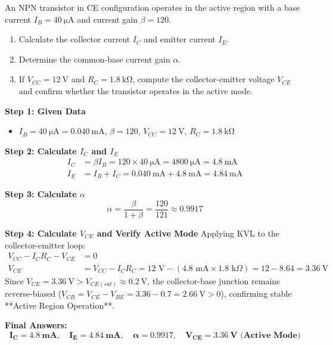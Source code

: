 \begin{example}
An NPN transistor in CE configuration operates in the active region with a base current $I_B = \SI{40}{\micro\ampere}$ and current gain $\beta = 120$. 
\begin{enumerate}
    \item Calculate the collector current $I_C$ and emitter current $I_E$.
    \item Determine the common-base current gain $\alpha$.
    \item If $V_{CC} = \SI{12}{\volt}$ and $R_C = \SI{1.8}{\kilo\ohm}$, compute the collector-emitter voltage $V_{CE}$ and confirm whether the transistor operates in the active mode.
\end{enumerate}

\tcblower
\textbf{Step 1: Given Data}
\begin{itemize}
    \item $I_B = \SI{40}{\micro\ampere} = \SI{0.040}{\milli\ampere}$, $\beta = 120$, $V_{CC} = \SI{12}{\volt}$, $R_C = \SI{1.8}{\kilo\ohm}$
\end{itemize}

\textbf{Step 2: Calculate $I_C$ and $I_E$}
\begin{align*}
    I_C &= \beta I_B = 120 \times \SI{40}{\micro\ampere} = \SI{4800}{\micro\ampere} = \SI{4.8}{\milli\ampere} \\
    I_E &= I_B + I_C = \SI{0.040}{\milli\ampere} + \SI{4.8}{\milli\ampere} = \SI{4.84}{\milli\ampere}
\end{align*}

\textbf{Step 3: Calculate $\alpha$}
\begin{equation*}
    \alpha = \frac{\beta}{1 + \beta} = \frac{120}{121} \approx 0.9917
\end{equation*}

\textbf{Step 4: Calculate $V_{CE}$ and Verify Active Mode}
Applying KVL to the collector-emitter loop:
\begin{align*}
    V_{CC} - I_C R_C - V_{CE} &= 0 \\
    V_{CE} &= V_{CC} - I_C R_C = 12\text{ V} - (4.8\text{ mA} \times 1.8\text{ k}\Omega) = 12 - 8.64 = \SI{3.36}{\volt}
\end{align*}
Since $V_{CE} = \SI{3.36}{\volt} > V_{CE(sat)} \approx \SI{0.2}{\volt}$, the collector-base junction remains reverse-biased ($V_{CB} = V_{CE} - V_{BE} = 3.36 - 0.7 = \SI{2.66}{\volt} > 0$), confirming stable **Active Region Operation**.

\textbf{Final Answers:}
$$\mathbf{I_C = \SI{4.8}{\milli\ampere}, \quad I_E = \SI{4.84}{\milli\ampere}, \quad \alpha = 0.9917, \quad V_{CE} = \SI{3.36}{\volt} \text{ (Active Mode)}}$$
\end{example}

